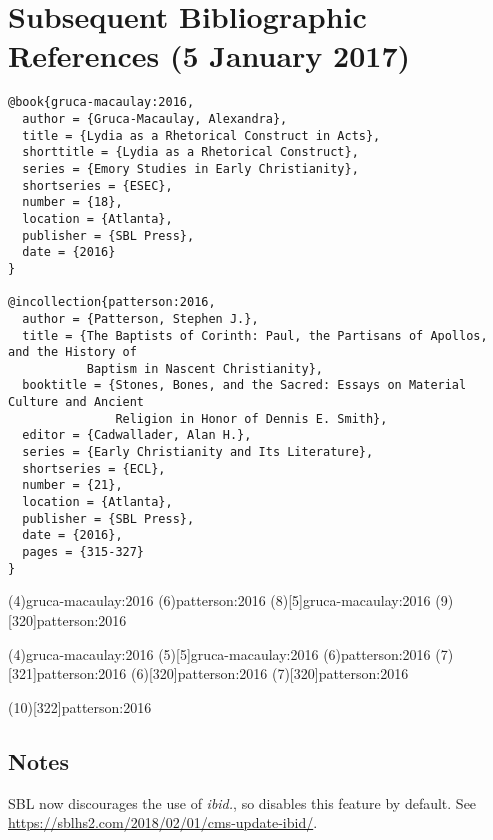 \documentclass[a4paper]{article}
\begin{document}
\section{Subsequent Bibliographic References (5 January 2017)}

\begin{verbatim}
@book{gruca-macaulay:2016,
  author = {Gruca-Macaulay, Alexandra},
  title = {Lydia as a Rhetorical Construct in Acts},
  shorttitle = {Lydia as a Rhetorical Construct},
  series = {Emory Studies in Early Christianity},
  shortseries = {ESEC},
  number = {18},
  location = {Atlanta},
  publisher = {SBL Press},
  date = {2016}
}

@incollection{patterson:2016,
  author = {Patterson, Stephen J.},
  title = {The Baptists of Corinth: Paul, the Partisans of Apollos, and the History of
           Baptism in Nascent Christianity},
  booktitle = {Stones, Bones, and the Sacred: Essays on Material Culture and Ancient
               Religion in Honor of Dennis E. Smith},
  editor = {Cadwallader, Alan H.},
  series = {Early Christianity and Its Literature},
  shortseries = {ECL},
  number = {21},
  location = {Atlanta},
  publisher = {SBL Press},
  date = {2016},
  pages = {315-327}
}
\end{verbatim}

\examplecite(4){gruca-macaulay:2016}
\examplecite(6){patterson:2016}
\examplecite(8)[5]{gruca-macaulay:2016}
\examplecite(9)[320]{patterson:2016}
\begin{verbcite}
  \citereset
\end{verbcite}
\examplecite(4){gruca-macaulay:2016}
\examplecite(5)[5]{gruca-macaulay:2016}
\examplecite(6){patterson:2016}
\examplecite(7)[321]{patterson:2016}
\examplecite(6)[320]{patterson:2016}
\examplecite(7)[320]{patterson:2016}
\begin{fverbcite}{9}
  \autocites[5]{gruca-macaulay:2016}[320]{patterson:2016}
\end{fverbcite}
\examplecite(10)[322]{patterson:2016}
\exampleabbreviations
\examplebibliography

\subsection{Notes}

SBL now discourages the use of \emph{ibid.}, so  disables
this feature by default. See
\url{https://sblhs2.com/2018/02/01/cms-update-ibid/}.

\end{document}

